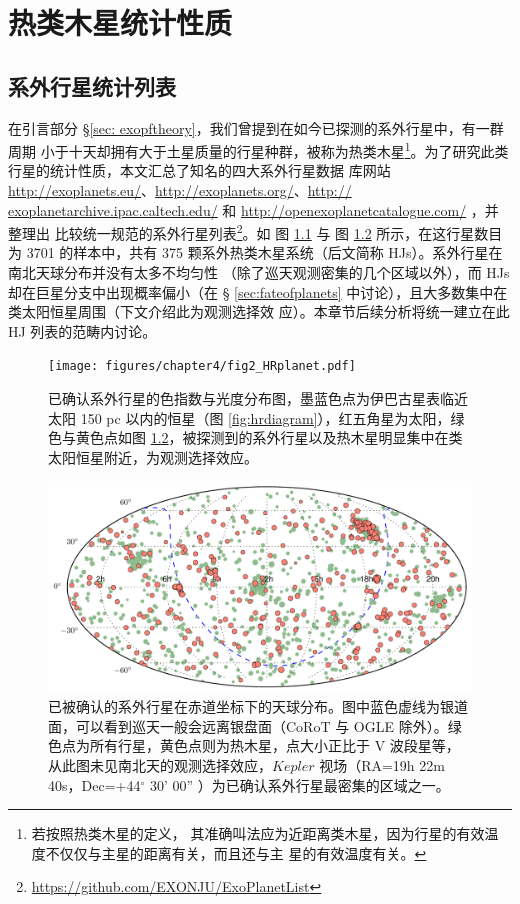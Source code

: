 \chapter{热类木星统计性质} \label{chapter:data_stat}

\section{系外行星统计列表}

在引言部分 \S \ref{sec: exopftheory}，我们曾提到在如今已探测的系外行星中，有一群周期
小于十天却拥有大于土星质量的行星种群，被称为热类木星\footnote{若按照热类木星的定义，
其准确叫法应为近距离类木星，因为行星的有效温度不仅仅与主星的距离有关，而且还与主
星的有效温度有关。}。为了研究此类行星的统计性质，本文汇总了知名的四大系外行星数据
库网站 \url{http://exoplanets.eu/}、\url{http://exoplanets.org/}、\url{http://
exoplanetarchive.ipac.caltech.edu/} 和 \url{http://openexoplanetcatalogue.com/} ，并整理出
比较统一规范的系外行星列表\footnote{\url{https://github.com/EXONJU/ExoPlanetList}}。如
图 \ref{fig:hrplanet} 与 图 \ref{fig:exoskydist} 所示，在这行星数目为 3701 的样本中，共有 
375 颗系外热类木星系统（后文简称 HJs）。系外行星在南北天球分布并没有太多不均匀性
（除了巡天观测密集的几个区域以外），而 HJs 却在巨星分支中出现概率偏小（在 \S 
\ref{sec:fateofplanets} 中讨论），且大多数集中在类太阳恒星周围（下文介绍此为观测选择效
应）。本章节后续分析将统一建立在此 HJ 列表的范畴内讨论。

\begin{figure}
\centering
\texttt{[image: figures/chapter4/fig2\_HRplanet.pdf]}
\caption{已确认系外行星的色指数与光度分布图，墨蓝色点为伊巴古星表临近太阳 150 pc 以内的恒星（图 \ref{fig:hrdiagram}），红五角星为太阳，绿色与黄色点如图 \ref{fig:exoskydist}，被探测到的系外行星以及热木星明显集中在类太阳恒星附近，为观测选择效应。}
\label{fig:hrplanet}
\end{figure}


\begin{figure}
\centering
\includegraphics[width=1.0\textwidth]{figures/chapter4/fig1_exodistmollweide.pdf}
\caption{已被确认的系外行星在赤道坐标下的天球分布。图中蓝色虚线为银道面，可以看到巡天一般会远离银盘面（CoRoT 与 OGLE 除外）。绿色点为所有行星，黄色点则为热木星，点大小正比于 V 波段星等，从此图未见南北天的观测选择效应，$Kepler$ 视场（RA=19h 22m 40s，Dec=+44$^\circ$ 30' 00'' ）为已确认系外行星最密集的区域之一。}
\label{fig:exoskydist}
\end{figure}


